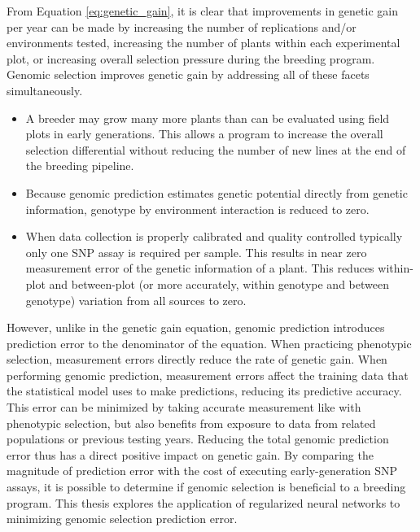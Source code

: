 From Equation \ref{eq:genetic_gain}, it is clear that improvements in genetic gain per year 
can be made by increasing the number of replications and/or 
environments tested, increasing the number of plants within each experimental plot, 
or increasing overall selection pressure during the breeding program. Genomic selection 
improves genetic gain by addressing all of these facets simultaneously.

\begin{itemize}
    \item A breeder may grow many more plants than can be evaluated using field plots in 
          early generations. This allows a program to increase the overall selection 
          differential without reducing the number of new lines at the end of the breeding pipeline.
    \item Because genomic prediction estimates genetic potential directly from genetic information,
          genotype by environment interaction is reduced to zero.
    \item When data collection is properly calibrated and quality controlled typically only one
          SNP assay is required per sample. This results in near zero measurement error of the 
          genetic information of a plant. This reduces within-plot and between-plot 
          (or more accurately, within genotype and between genotype) variation from all sources to zero.
\end{itemize}

However, unlike in the genetic gain equation, genomic prediction introduces prediction error to 
the denominator of the equation. When practicing phenotypic selection, measurement errors 
directly reduce the rate of genetic gain. When performing genomic prediction, measurement errors 
affect the training data that the statistical model uses to make predictions, reducing its predictive 
accuracy. This error can be minimized by taking accurate measurement like with phenotypic selection, 
but also benefits from exposure to data from related populations or previous testing years. 
Reducing the total genomic prediction error thus has a direct positive impact on genetic gain. 
By comparing the magnitude of prediction error with the cost of executing early-generation 
SNP assays, it is possible to determine if genomic selection is beneficial to a breeding 
program. This thesis explores the application of regularized neural networks to 
minimizing genomic selection prediction error.

